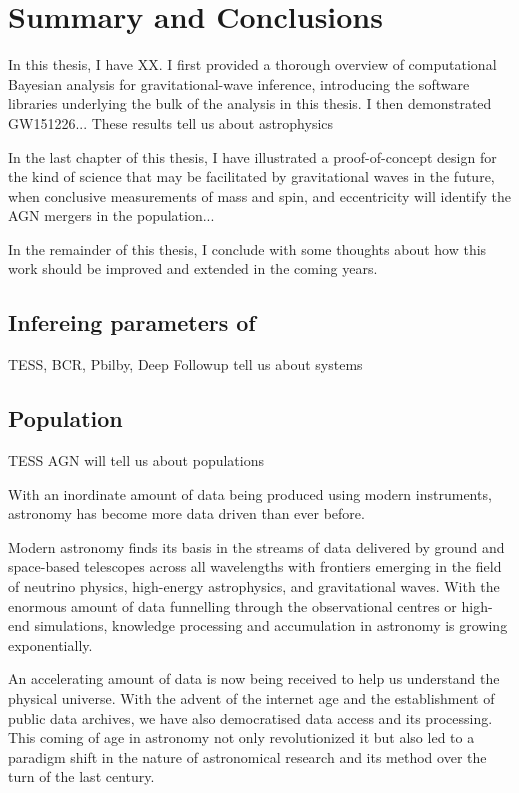 \chapter{Summary and Conclusions}
\label{cp.conc}
In this thesis, I have XX.
I first provided a thorough overview of computational Bayesian analysis for gravitational-wave inference, introducing the software libraries underlying the bulk of the analysis in this thesis.
I then demonstrated GW151226...
These results tell us about astrophysics

In the last chapter of this thesis, I have illustrated a proof-of-concept design for the kind of science that may be facilitated by gravitational waves in the future, when conclusive measurements of mass and spin, and eccentricity will identify the AGN mergers in the population...

In the remainder of this thesis, I conclude with some thoughts about how this work should be improved and extended in the coming years.

\section{Infereing parameters of }

TESS, BCR, Pbilby, Deep Followup tell us about systems

\section{Population}
TESS AGN will tell us about populations





With an inordinate amount of data being produced using modern instruments, astronomy has become more data driven than ever before.


Modern astronomy finds its basis in the streams of data delivered by ground and space-based telescopes across all wavelengths with frontiers emerging in the field of neutrino physics, high-energy astrophysics, and gravitational waves.
With the enormous amount of data funnelling through the observational centres or high-end simulations, knowledge processing and accumulation in astronomy is growing exponentially.


An accelerating amount of data is now being received to help us understand the physical universe. With the advent of the internet age and the establishment of public data archives, we have also democratised data access and its processing. This coming of age in astronomy not only revolutionized it but also led to a paradigm shift in the nature of astronomical research and its method over the turn of the last century.



